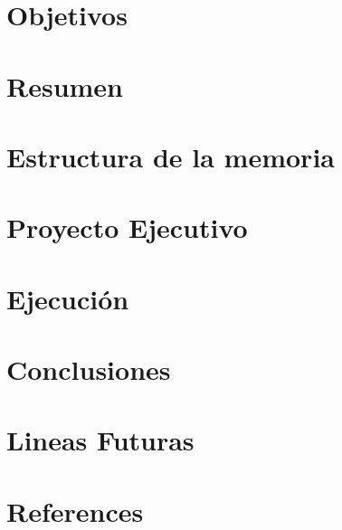 \documentclass[12pt,a4paper,spanish]{article}
\begin{document}
    
%	
    
    \glsaddall
    \printnoidxglossary[style=tree,title=Glosario,nonumberlist]\label{sec:glossary}

    \newpage
    \section{Objetivos}\label{sec:objetivos}
    

    \newpage
    \section{Resumen}\label{sec:introduccion}
    

    \newpage
    \section{Estructura de la memoria}\label{sec:estructura}
    

    \newpage
    \section{Proyecto Ejecutivo}\label{sec:proyecto_ejecutivo}
    

    \newpage
    \section{Ejecución}\label{sec:ejecucion}
    
%		

    \newpage
    \section{Conclusiones}\label{sec:conclusiones}
    


    \section{Lineas Futuras}\label{sec:lineas_futuras}
    
    \newpage


    \section{References}\label{sec:references}
\end{document}
